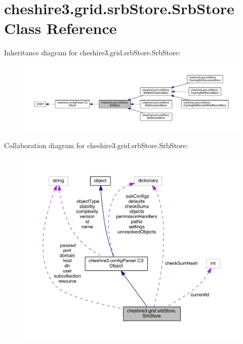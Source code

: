 \hypertarget{classcheshire3_1_1grid_1_1srb_store_1_1_srb_store}{\section{cheshire3.\-grid.\-srb\-Store.\-Srb\-Store Class Reference}
\label{classcheshire3_1_1grid_1_1srb_store_1_1_srb_store}
}


Inheritance diagram for cheshire3.\-grid.\-srb\-Store.\-Srb\-Store\-:
\nopagebreak
\begin{figure}[H]
\begin{center}
\leavevmode
\includegraphics[width=350pt]{classcheshire3_1_1grid_1_1srb_store_1_1_srb_store__inherit__graph}
\end{center}
\end{figure}


Collaboration diagram for cheshire3.\-grid.\-srb\-Store.\-Srb\-Store\-:
\nopagebreak
\begin{figure}[H]
\begin{center}
\leavevmode
\includegraphics[width=350pt]{classcheshire3_1_1grid_1_1srb_store_1_1_srb_store__coll__graph}
\end{center}
\end{figure}

